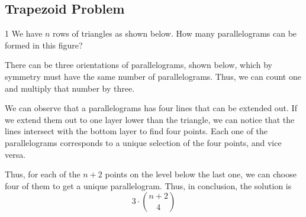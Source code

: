 \subsection{Trapezoid Problem}
\begin{problem}
	1 We have $n$ rows of triangles as shown below. How many parallelograms can be formed in this figure?
\end{problem}
\begin{figure}[h]
\centering
\end{figure}
\begin{solution}
There can be three orientations of parallelograms, shown below, which by symmetry must have the same number of parallelograms. Thus, we can count one and multiply that number by three.
\begin{figure}[H]
\centering
\end{figure}
We can observe that a parallelograms has four lines that can be extended out. If we extend them out to one layer lower than the triangle, we can notice that the lines intersect with the bottom layer to find four points. Each one of the parallelograms corresponds to a unique selection of the four points, and vice versa.
\begin{figure}[H]
\centering
\end{figure}
Thus, for each of the $n+2$ points on the level below the last one, we can choose four of them to get a unique parallelogram. Thus, in conclusion, the solution is \[3\cdot{n+2 \choose 4}\]
\end{solution}
